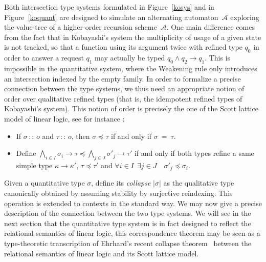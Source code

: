 \documentclass{eptcs}
\newcommand{\collapse}[1]{\vert #1 \vert}
\begin{document}
Both intersection type systems formulated in Figure~\ref{kosys}
and in Figure~\ref{koquant} are designed to simulate an alternating automaton~$\mathcal{A}$
exploring the value-tree of a higher-order recursion scheme~$\mathcal{A}$.
One main difference comes from the fact that in Kobayashi's system the multiplicity of usage 
of a given state is not tracked, so that a function using its argument twice with refined type $q_0$
in order to answer a request $q_1$ may actually be typed $q_0 \wedge q_2 \rightarrow q_1$. 
This is impossible in the quantitative system, where the Weakening rule only introduces an intersection indexed by the empty family. In order to formalize a precise connection between the type systems, we thus need an appropriate notion of order over qualitative refined types (that is, the idempotent refined types of Kobayashi's system). 
This notion of order is precisely the one of the Scott lattice model of linear logic, see for instance \cite{terui,ehrhard-collapse}:
\begin{itemize}
\item If $\sigma \,::\, o$ and $\tau \,::\, o$, then $\sigma \preccurlyeq \tau$ if and only if $\sigma\ =\ \tau$.
\item Define $\bigwedge_{i \in I} \sigma_i \rightarrow \tau \preccurlyeq \bigwedge_{j \in J} \sigma'_j \rightarrow \tau'$ if and only if both types refine a same simple type $\kappa \rightarrow \kappa'$, $\tau \preccurlyeq \tau'$ and $\forall i \in I\ \ \exists j \in J \quad \sigma'_j \preccurlyeq \sigma_i$.
\end{itemize}
Given a quantitative type $\sigma$, define its \emph{collapse} $\collapse{\sigma}$ as the qualitative type canonically obtained by assuming stability by surjective reindexing. 
This operation is extended to contexts in the standard way. 
We may now give a precise description of the connection between the two type systems.
We will see in the next section that the quantitative type system is in fact designed to reflect the relational semantics of linear logic,
this correspondence theorem may be seen as a type-theoretic transcription of Ehrhard's recent collapse theorem~\cite{ehrhard-collapse}
between the relational semantics of linear logic and its Scott lattice model.
\end{document}
